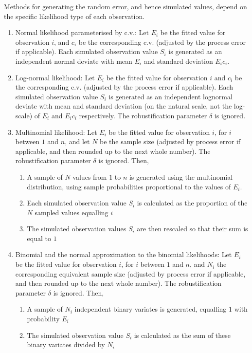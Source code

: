 Methods for generating the random error, and hence simulated values, depend on the specific likelihood type of each observation. 

\begin{enumerate}
  \item{} Normal likelihood parameterised by c.v.: Let $E_{i}$ be the fitted value for observation $i$, and $c_i$ be the corresponding c.v. (adjusted by the process error if applicable). Each simulated observation value $S_i$ is generated as an independent normal deviate with mean $E_i$ and standard deviation $E_i c_i$.
  \item{} Log-normal likelihood: Let $E_i$ be the fitted value for observation $i$ and $c_i$ be the corresponding c.v. (adjusted by the process error if applicable). Each simulated observation value $S_i$ is generated as an independent lognormal deviate with mean and standard deviation (on the natural scale, not the log-scale) of $E_i$ and $E_i c_i$ respectively. The robustification parameter $\delta$ is ignored.
  \item{} Multinomial likelihood: Let $E_i$ be the fitted value for observation $i$, for $i$ between $1$ and $n$, and let $N$ be the sample size (adjusted by process error if applicable, and then rounded up to the next whole number). The robustification parameter $\delta$ is ignored. Then, 
  \begin{enumerate}
    \item{} A sample of $N$ values from $1$ to $n$ is generated using the multinomial distribution, using sample probabilities proportional to the values of $E_i$.
    \item{} Each simulated observation value $S_i$ is calculated as the proportion of the $N$ sampled values equalling $i$
    \item{} The simulated observation values $S_i$ are then rescaled so that their sum is equal to $1$
  \end{enumerate}
\item{} Binomial and the normal approximation to the binomial likelihoods: Let $E_i$ be the fitted value for observation $i$, for $i$ between $1$ and $n$, and $N_i$ the corresponding equivalent sample size (adjusted by process error if applicable, and then rounded up to the next whole number). The robustification parameter $\delta$ is ignored. Then, 
  \begin{enumerate}
    \item{} A sample of $N_i$ independent binary variates is generated, equalling $1$ with probability $E_i$ 
    \item{}	The simulated observation value $S_i$ is calculated as the sum of these binary variates divided by $N_i$
  \end{enumerate}
\end{enumerate}

